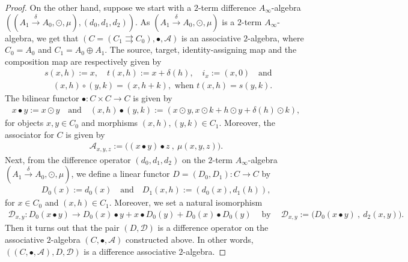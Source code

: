 \documentclass[a4paper,reqno,10pt]{amsart}
\theoremstyle{plain}
\theoremstyle{definition}
\theoremstyle{remark}
\begin{document}
\begin{proof}
On the other hand, suppose we start with a $2$-term difference $A_\infty$-algebra $ ((A_1 \xrightarrow{\delta} A_0, \odot, \mu ), (d_0, d_1, d_2) )$. As $(A_1 \xrightarrow{\delta} A_0, \odot, \mu )$ is a $2$-term $A_\infty$-algebra, we get that $(C = (C_1 \rightrightarrows C_0), \bullet, \mathcal{A})$ is an associative $2$-algebra, where $C_0 = A_0$ and $C_1 = A_0 \oplus A_1$. The source, target, identity-assigning map and the composition map are respectively given by
\begin{align*}
   & s (x, h) := x, \quad t (x, h) := x + \delta (h), \quad i_x := (x, 0) ~~~ \text{ and }\\
   & \quad (x, h) \circ (y, k) = (x, h+k), \text{ when } t (x, h) = s (y,k).
\end{align*}
The bilinear functor $\bullet : C \times C \rightarrow C$ is given by
\begin{align*}
     x \bullet y := x \odot y ~~~ \text{ and } ~~~ (x, h) \bullet (y, k) := (x \odot y, x \odot k + h \odot y + \delta (h) \odot k),
\end{align*}
for objects $x, y \in C_0$ and morphisms $(x, h), (y, k) \in C_1$. Moreover, the associator for $C$ is given by
\begin{align*}
    \mathcal{A}_{x, y, z} := \big(  (x \bullet y) \bullet z ~\!, ~ \! \mu (x, y, z)   \big).
\end{align*}
Next, from the difference operator $(d_0, d_1, d_2)$ on the $2$-term $A_\infty$-algebra $(A_1 \xrightarrow{\delta} A_0, \odot, \mu )$, we define a linear functor $D = (D_0, D_1) : C \rightarrow C$ by
\begin{align*}
    D_0 (x) := d_0 (x) ~~~ \text{ and } ~~~D_1 (x, h) := (d_0 (x), d_1 (h)),
\end{align*}
for $x \in C_0$ and $(x, h) \in C_1$. Moreover, we set a natural isomorphism
\begin{align*}
    \mathcal{D}_{x, y} : D_0 (x \bullet y) \rightarrow D_0 (x) \bullet y + x \bullet D_0 (y) + D_0 (x) \bullet D_0 (y) ~~~~   \text{ by } ~~~~  \mathcal{D}_{x, y} := \big(  D_0 (x \bullet y) ~\!, ~\! d_2 (x, y)  \big).
\end{align*}
Then it turns out that the pair $(D, \mathcal{D})$ is a difference operator on the associative $2$-algebra $(C, \bullet, \mathcal{A})$ constructed above. In other words, $((C , \bullet, \mathcal{A}), D, \mathcal{D})$ is a difference associative $2$-algebra.

\medskip


\end{proof}
\end{document}
